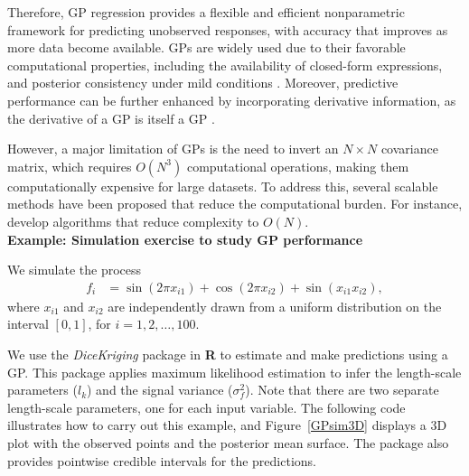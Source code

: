 Therefore, GP regression provides a flexible and efficient nonparametric framework for predicting unobserved responses, with accuracy that improves as more data become available. GPs are widely used due to their favorable computational properties, including the availability of closed-form expressions, and posterior consistency under mild conditions \cite{choi2007posterior, stuart2018posterior}. Moreover, predictive performance can be further enhanced by incorporating derivative information, as the derivative of a GP is itself a GP \cite{solak2003derivative,jacobi2024posterior}. 

However, a major limitation of GPs is the need to invert an \( N \times N \) covariance matrix, which requires \( O(N^3) \) computational operations, making them computationally expensive for large datasets. To address this, several scalable methods have been proposed that reduce the computational burden. For instance, \cite{wilson2015kernel,gardner2018product, pleiss2018constant} develop algorithms that reduce complexity to \( O(N) \).\\

\textbf{Example: Simulation exercise to study GP performance}

We simulate the process
\begin{align*}
	f_i & = \sin(2\pi x_{i1}) + \cos(2\pi x_{i2}) + \sin(x_{i1} x_{i2}),
\end{align*}
where $x_{i1}$ and $x_{i2}$ are independently drawn from a uniform distribution on the interval $[0, 1]$, for $i = 1, 2, \dots, 100$.

We use the \textit{DiceKriging} package in \textbf{R} to estimate and make predictions using a GP. This package applies maximum likelihood estimation to infer the length-scale parameters ($l_k$) and the signal variance ($\sigma_f^2$). Note that there are two separate length-scale parameters, one for each input variable. The following code illustrates how to carry out this example, and Figure~\ref{GPsim3D} displays a 3D plot with the observed points and the posterior mean surface. The package also provides pointwise credible intervals for the predictions.

